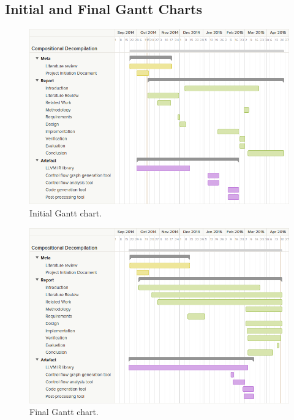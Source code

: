 
\subsection{Initial and Final Gantt Charts}

\begin{figure}[htbp]
	\begin{center}
		\includegraphics[width=\textwidth]{inc/appendices/gantt_charts/gantt_initial.png}
		\caption{Initial Gantt chart.}
	\end{center}
\end{figure}

\begin{figure}[htbp]
	\begin{center}
		\includegraphics[width=\textwidth]{inc/appendices/gantt_charts/gantt_final.png}
		\caption{Final Gantt chart.}
	\end{center}
\end{figure}
